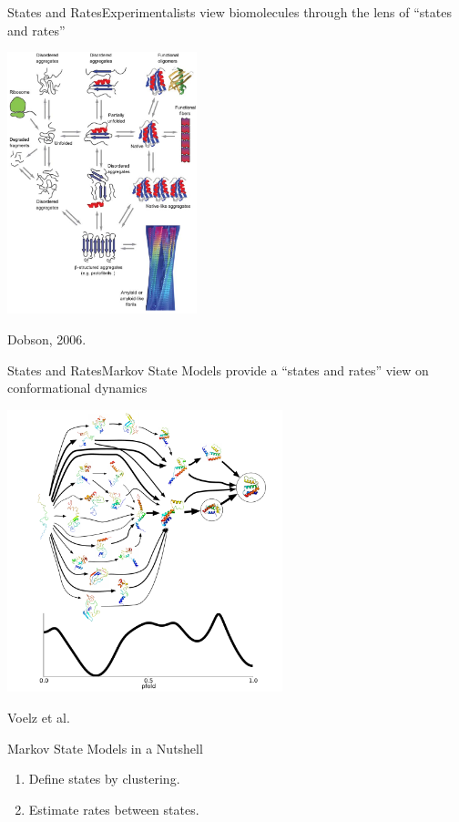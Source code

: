 \documentclass[10pt]{beamer}
\begin{document}
\begin{frame}{States and Rates}{Experimentalists view biomolecules through the lens of ``states and rates''}
 
 \includegraphics[width=55mm]{Figures/misfolding_dobson2006}
 
  \tiny Dobson, 2006.
 
\end{frame}

\begin{frame}{States and Rates}{Markov State Models provide a ``states and rates'' view on conformational dynamics}
 
 \includegraphics[width=80mm]{Figures/coordinate}
 
  \tiny Voelz et al.
 
\end{frame}

\begin{frame}{Markov State Models in a Nutshell}

\begin{enumerate}
 \item Define states by clustering.
 \item Estimate rates between states.
\end{enumerate}

\end{frame}
\end{document}

